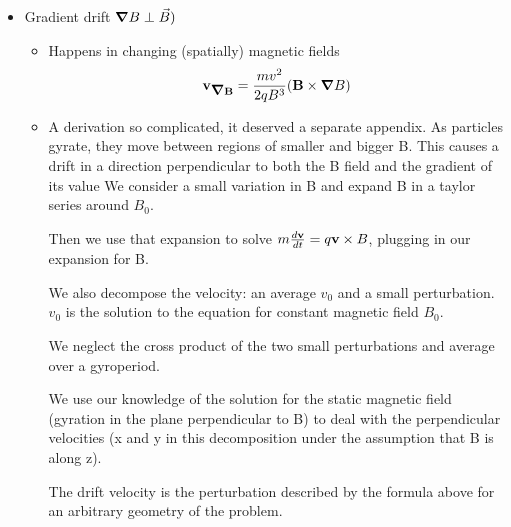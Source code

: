 \documentclass[PlasmaNotes.tex]{subfiles}
\begin{document}
\begin{itemize}
		\item Gradient drift $\mbox{\boldmath$ \nabla $} B \perp \vec{B})$
		\begin{itemize}
		\item	Happens in changing (spatially) magnetic fields
		\[\mathbf{v_{\mbox{\boldmath$ \nabla $} B}} = \frac{m v^2}{2 q B^3} (\mathbf{B} \times {\ensuremath{\mbox{\boldmath$ \nabla $}} B} ) \]
			\item A derivation so complicated, it deserved a separate appendix.
			As particles gyrate, they move between regions of smaller and bigger B.
			This causes a drift in a direction perpendicular to both the B field and the gradient of its value
			We consider a small variation in B and expand B in a taylor series around $B_0$.
			
			Then we use that expansion to solve $m \frac{d \mathbf{v}}{d t} = q {\mathbf{v} \times {B}}$, plugging in our expansion for B.
			
			We also decompose the velocity: an average $v_{0}$ and a small perturbation. $v_{0}$ is the solution to the equation for constant magnetic field $B_{0}$.
			
			We neglect the cross product of the two small perturbations and average over a gyroperiod.
			
			We use our knowledge of the solution for the static magnetic field (gyration in the plane perpendicular to B) to deal with the perpendicular velocities (x and y in this decomposition under the assumption that B is along z).
			
			The drift velocity is the perturbation described by the formula above for an arbitrary geometry of the problem.
		\end{itemize}
	\end{itemize}
	
	
\end{document}
